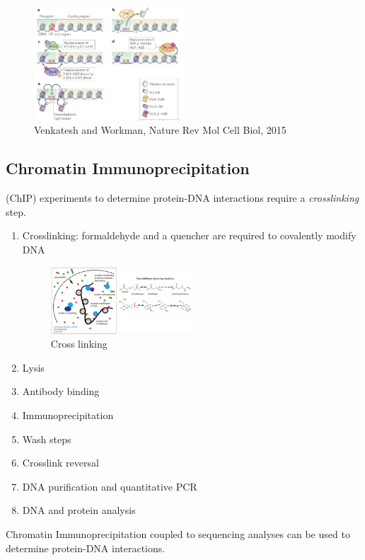 \begin{figure}
\centering
\includegraphics[width=0.5\textwidth]{../_resources/Screenshot_2022-09-23_at_15-22-44.png}
\caption{Venkatesh and Workman, Nature Rev Mol Cell Biol, 2015}
\label{fig:pronucleo}
\end{figure}

\subsection{Chromatin Immunoprecipitation} 
(ChIP) experiments to determine protein-DNA interactions require a \emph{crosslinking} step.

\begin{enumerate}
\tightlist
\item
  Crosslinking: formaldehyde and a quencher are required to covalently modify DNA

\begin{figure}
\centering
\includegraphics[width=0.5\textwidth]{../_resources/Screenshot_2022-09-22_at_21-36-39.png}
\caption{Cross linking}
\end{figure}

\item
  Lysis
\item
  Antibody binding
\item
  Immunoprecipitation
\item
  Wash steps
\item
  Crosslink reversal
\item
  DNA purification and quantitative PCR
\item
  DNA and protein analysis
\end{enumerate}
 Chromatin Immunoprecipitation coupled to sequencing analyses can be used to determine protein-DNA interactions.
 
